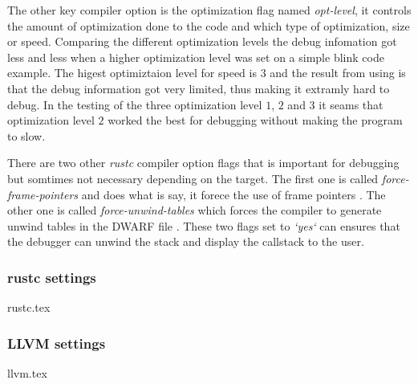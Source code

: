 The other key compiler option is the optimization flag named \emph{opt-level}, it controls the amount of optimization done to the code and which type of optimization, size or speed.
Comparing the different optimization levels the debug infomation got less and less when a higher optimization level was set on a simple blink code example.
The higest optimiztaion level for speed is $3$ and the result from using is that the debug information got very limited, thus making it extramly hard to debug.
In the testing of the three optimization level $1$, $2$ and $3$ it seams that optimization level $2$ worked the best for debugging without making the program to slow.


There are two other \emph{rustc} compiler option flags that is important for debugging but somtimes not necessary depending on the target.
The first one is called \emph{force-frame-pointers} and does what is say, it forece the use of frame pointers \cite{rustc-book-codegen}.
The other one is called \emph{force-unwind-tables} which forces the compiler to generate unwind tables in the \gls{DWARF} file \cite{rustc-book-codegen}.
These two flags set to \emph{`yes`} can ensures that the debugger can unwind the stack and display the callstack to the user.


\subsubsection{rustc settings}
{rustc.tex}


\subsubsection{LLVM settings}
{llvm.tex}


